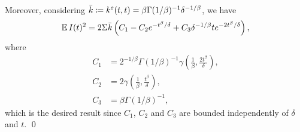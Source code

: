 \documentclass[10pt]{article}
\begin{document}
\begin{appendices}
\begin{equation}
\begin{aligned}
\end{aligned}
\end{equation}
Moreover, considering $\bar k \coloneqq k^\varepsilon(t, t) = \beta \Gamma(1/\beta)^{-1}\delta^{-1/\beta}$, we have
\begin{equation}
\operatorname{\mathbb{E}} I(t)^2 = 2 \Sigma \bar k  \left( C_1 - C_2 e^{-t^\beta/\delta} + C_3 \delta^{-1/\beta} t e^{-2t^\beta/\delta}\right),
\end{equation}
where 
\begin{equation}\label{eq:LemmaDiffusionConstants}
\begin{aligned}
C_1 &= 2^{-1/\beta} \Gamma(1/\beta)^{-1} \gamma\left(\frac1\beta, \frac{2t^\beta}{\delta}\right), \\
C_2 &= 2 \gamma\left(\frac1\beta, \frac{t^\beta}{\delta}\right),\\
C_3 &= \beta \Gamma(1/\beta)^{-1},
\end{aligned}
\end{equation}
which is the desired result since $C_1$, $C_2$ and $C_3$ are bounded independently of $\delta$ and $t$. \qed


\end{appendices}
\end{document}
